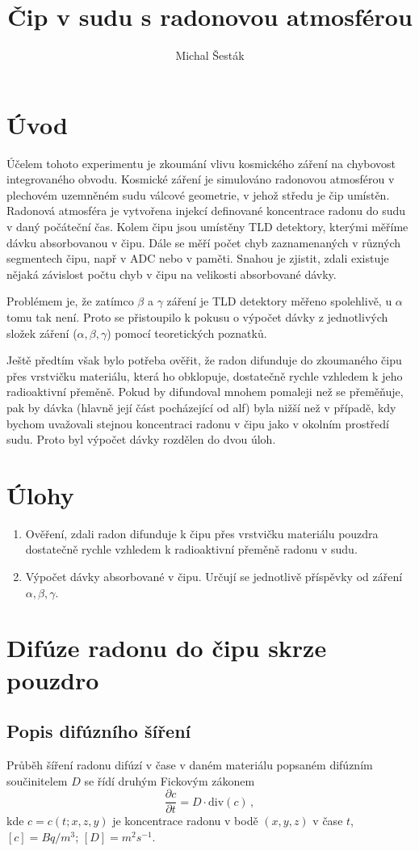 \documentclass[11pt,a4paper]{article}
\author{Michal Šesták}
\title{Čip v sudu s radonovou atmosférou}
\begin{document}
\maketitle	
\tableofcontents
\section{Úvod}
Účelem tohoto experimentu je zkoumání vlivu kosmického záření na chybovost integrovaného obvodu. Kosmické záření je simulováno radonovou atmosférou v plechovém uzemněném sudu válcové geometrie, v jehož středu je čip umístěn. Radonová atmosféra je vytvořena injekcí definované koncentrace radonu do sudu v daný počáteční čas. Kolem čipu jsou umístěny TLD detektory, kterými měříme dávku absorbovanou v čipu. Dále se měří počet chyb zaznamenaných v různých segmentech čipu, např v ADC nebo v paměti. Snahou je zjistit, zdali existuje nějaká závislost počtu chyb v čipu na velikosti absorbované dávky.

Problémem je, že zatímco $\beta$ a $\gamma$ záření je TLD detektory měřeno spolehlivě, u $\alpha$ tomu tak není. Proto se přistoupilo k pokusu o výpočet dávky z jednotlivých složek záření ($\alpha, \beta, \gamma$) pomocí teoretických poznatků. 

Ještě předtím však bylo potřeba ověřit, že radon difunduje do zkoumaného čipu přes vrstvičku materiálu, která ho obklopuje, dostatečně rychle vzhledem k jeho radioaktivní přeměně. Pokud by difundoval mnohem pomaleji než se přeměňuje, pak by dávka (hlavně její část pocházející od alf) byla nižší než v případě, kdy bychom uvažovali stejnou koncentraci radonu v čipu jako v okolním prostředí sudu. Proto byl výpočet dávky rozdělen do dvou úloh.
\section{Úlohy}
\begin{enumerate}
	\item Ověření, zdali radon difunduje k čipu přes vrstvičku materiálu pouzdra dostatečně rychle vzhledem k radioaktivní přeměně radonu v sudu.
	\item Výpočet dávky absorbované v čipu. Určují se jednotlivě příspěvky od záření $\alpha, \beta, \gamma$.
\end{enumerate}
\section{Difúze radonu do čipu skrze pouzdro}
\subsection{Popis difúzního šíření}
Průběh šíření radonu difúzí v čase v daném materiálu popsaném difúzním součinitelem $D$ se řídí druhým Fickovým zákonem
\begin{equation}
\frac{\partial c}{\partial t}=D\cdot \text{div}(c)\,,\label{eq:fickuvLawObecne}
\end{equation}
kde $c=c(t;x,z,y)$ je koncentrace radonu v bodě $(x,y,z)$ v čase $t$, $[c]=\si{Bq/m^3}$; $[D]=\si{m^2s^{-1}}$. 
\end{document}
